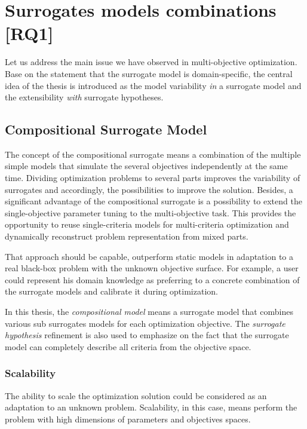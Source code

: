     \section{Surrogates models combinations [RQ1]}

        Let us address the main issue we have observed in multi-objective optimization. Base on the statement that the surrogate model is domain-specific, the central idea of the thesis is introduced as the model variability \emph{in} a surrogate model and the extensibility \emph{with} surrogate hypotheses.

        \subsection{Compositional Surrogate Model}
            The concept of the compositional surrogate means a combination of the multiple simple models that simulate the several objectives independently at the same time. Dividing optimization problems to several parts improves the variability of surrogates and accordingly, the possibilities to improve the solution.
            Besides, a significant advantage of the compositional surrogate is a possibility to extend the single-objective parameter tuning to the multi-objective task. This provides the opportunity to reuse single-criteria models for multi-criteria optimization and dynamically reconstruct problem representation from mixed parts.
            

            That approach should be capable, outperform static models in adaptation to a real black-box problem with the unknown objective surface. For example, a user could represent his domain knowledge as preferring to a concrete combination of the surrogate models and calibrate it during optimization. 
            
            In this thesis, the \emph{compositional model} means a surrogate model that combines various sub surrogates models for each optimization objective. The \emph{surrogate hypothesis} refinement is also used to emphasize on the fact that the surrogate model can completely describe all criteria from the objective space.

            \subsubsection{Scalability}
                The ability to scale the optimization solution could be considered as an adaptation to an unknown problem. Scalability, in this case, means perform the problem with high dimensions of parameters and objectives spaces.


